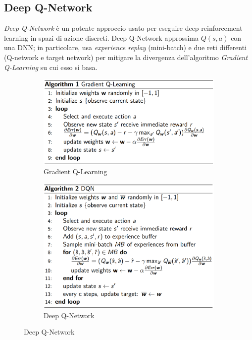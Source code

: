\documentclass[11pt,oneside]{book}
\begin{document}
\subsection{Deep Q-Network}
\textit{Deep Q-Network} è un potente approccio usato per eseguire deep reinforcement learning in spazi di azione discreti. Deep Q-Network approssima $Q(s,a)$ con una DNN; in particolare, usa \textit{experience replay} (mini-batch) e due reti differenti (Q-network e target network) per mitigare la divergenza dell'algoritmo \textit{Gradient Q-Learning} su cui esso si basa.
\begin{figure}[htp]
	\begin{subfigure}{0.49\textwidth}
	    \centering
		\includegraphics[width=\textwidth, height=\textheight, keepaspectratio]{dqn1.png}
		\caption{Gradient Q-Learning}
	\end{subfigure}
	\hfill
	\begin{subfigure}{0.49\textwidth}
	    \centering
		\includegraphics[width=\textwidth, height=\textheight, keepaspectratio]{dqn2.png}
		\caption{Deep Q-Network}
	\end{subfigure}
\end{figure}
\end{document}
